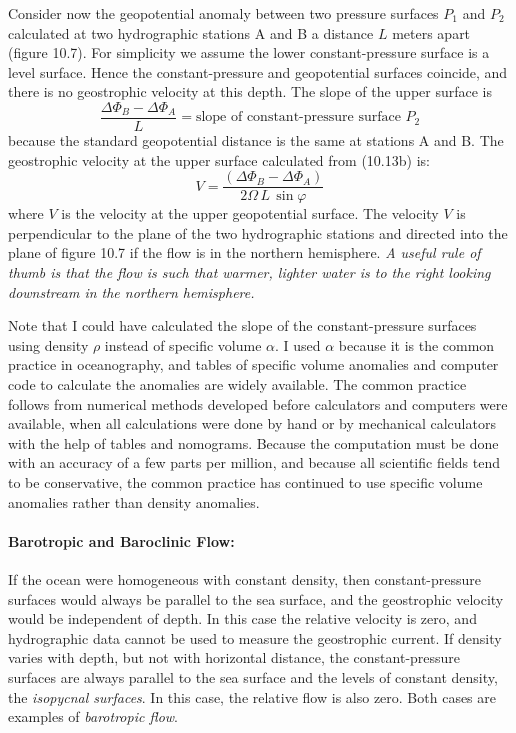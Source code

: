 Consider now the geopotential anomaly between two pressure surfaces $P_1$ and
$P_2$ calculated at two hydrographic stations A
and B a distance $L$ meters apart (figure 10.7). For simplicity we assume the lower
constant-pressure surface is a level surface. Hence the constant-pressure and geopotential
surfaces coincide, and there is no geostrophic velocity at this depth. The slope of the
upper surface is
\begin{displaymath}
\frac{\Delta\Phi_B - \Delta\Phi_A}{L} =\text{slope of constant-pressure
surface $P_2$}
\end{displaymath}
because the standard geopotential distance is the same at stations A and B. The
geostrophic velocity at the upper surface calculated from
(10.13b) is:
\begin{equation}
V =\frac{\left(\Delta\Phi_B - \Delta\Phi_A\right)}{2\Omega\,L\, \sin\varphi }
\end{equation}
where $V$ is the velocity at the upper geopotential surface. The velocity $V$ is
perpendicular to the plane of the two hydrographic stations and
directed into the plane of figure 10.7 if the flow is in the northern hemisphere. \textit{A
useful rule of thumb is that the flow is such that warmer, lighter water is to the right
looking downstream in the northern hemisphere.}

Note that I could have calculated the slope of the constant-pressure surfaces using density $\rho$ instead of specific volume $\alpha$. I used $\alpha$ because it is the common practice in oceanography, and tables of specific volume anomalies and computer code to calculate the anomalies are widely available. The common practice follows from numerical methods developed before calculators and computers were available, when all calculations were done by hand or by mechanical calculators  with the help of tables and nomograms. Because the computation must be done with an accuracy of a few parts per million, and because all scientific fields tend to be conservative, the common practice has continued to use specific volume anomalies rather than density anomalies.

\paragraph{Barotropic and Baroclinic Flow:}
If the ocean were homogeneous with constant density, then constant-pressure surfaces
would always be parallel to the sea surface, and the geostrophic velocity would be
independent of depth. In this case the relative velocity is zero, and hydrographic
data cannot be used to measure the
geostrophic current. If density varies with depth, but not with horizontal distance, the
constant-pressure surfaces are always parallel to the sea surface and the levels of constant
density, the
\textit{isopycnal surfaces}. In this case, the relative flow
is also zero. Both cases are examples of \textit{barotropic flow}.

